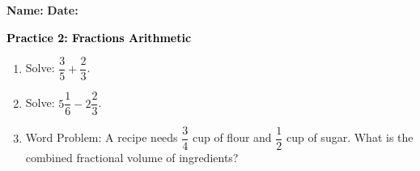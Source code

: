 \documentclass[12pt, letterpaper, fleqn]{article}
\begin{document}
\textbf{Name:} \underline{\hspace{5cm}}
\hfill
\textbf{Date:} \underline{\hspace{3cm}}\\

\begin{tcolorbox}[colback=customteal!20]
    \large\textcolor{black}{\textbf{Practice 2: Fractions Arithmetic}}
\end{tcolorbox}
\begin{enumerate}[itemsep=3.5cm, leftmargin=0.6cm]
\item Solve: $\dfrac{3}{5} + \dfrac{2}{3}$.
\vspace{3.5cm}
\item Solve: $5\dfrac{1}{6} - 2\dfrac{2}{3}$.
\vspace{3.5cm}
\item Word Problem: A recipe needs $\dfrac{3}{4}$ cup of flour and $\dfrac{1}{2}$ cup of sugar. What is the combined fractional volume of ingredients?
\end{enumerate}
\end{document}
